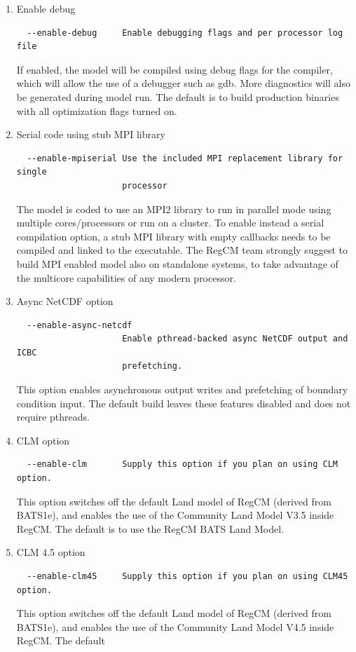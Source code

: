 \begin{enumerate}
\item Enable debug
\begin{Verbatim}
  --enable-debug     Enable debugging flags and per processor log file
\end{Verbatim}
If enabled, the model will be compiled using debug flags for the compiler,
which will allow the use of a debugger such as gdb. More diagnostics will
also be generated during model run.
The default is to build production binaries with all optimization flags
turned on.

\item Serial code using stub MPI library
\begin{Verbatim}
  --enable-mpiserial Use the included MPI replacement library for single
                     processor
\end{Verbatim}
The model is coded to use an MPI2 library to run in parallel mode using
multiple cores/processors or run on a cluster. To enable instead a serial
compilation option, a stub MPI library with empty callbacks needs to be
compiled and linked to the executable.
The RegCM team strongly suggest to build MPI enabled model also on standalone
systems, to take advantage of the multicore capabilities of any modern
processor.
\item Async NetCDF option
\begin{Verbatim}
  --enable-async-netcdf
                     Enable pthread-backed async NetCDF output and ICBC
                     prefetching.
\end{Verbatim}
This option enables asynchronous output writes and prefetching of boundary
condition input. The default build leaves these features disabled and does not
require pthreads.
\item CLM option
\begin{Verbatim}
  --enable-clm       Supply this option if you plan on using CLM option.
\end{Verbatim}
This option switches off the default Land model of RegCM (derived from BATS1e),
and enables the use of the Community Land Model V3.5 inside RegCM. The default
is to use the RegCM BATS Land Model.
\item CLM 4.5 option
\begin{Verbatim}
  --enable-clm45     Supply this option if you plan on using CLM45 option.
\end{Verbatim}
This option switches off the default Land model of RegCM (derived from BATS1e),
and enables the use of the Community Land Model V4.5 inside RegCM. The default

\end{enumerate}
